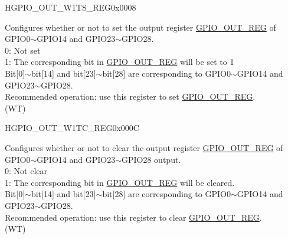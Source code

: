 \begin{register}{H}{GPIO\_OUT\_W1TS\_REG}{0x0008}\label{regdesc:GPIOOUTW1TSREG}
%
\regnewline%
\begin{regdesc}\begin{reglist}
\label{fielddesc:GPIOOUTW1TS}\item [GPIO\_OUT\_W1TS] Configures whether or not to set the output register \hyperref[regdesc:GPIOOUTREG]{GPIO\_OUT\_REG} of GPIO0$\sim$GPIO14 and GPIO23$\sim$GPIO28.\\
0: Not set\\
1: The corresponding bit in \hyperref[regdesc:GPIOOUTREG]{GPIO\_OUT\_REG} will be set to 1\\
Bit[0]$\sim$bit[14] and bit[23]$\sim$bit[28] are corresponding to GPIO0$\sim$GPIO14 and GPIO23$\sim$GPIO28. \\
Recommended operation: use this register to set \hyperref[regdesc:GPIOOUTREG]{GPIO\_OUT\_REG}. \\ (WT)
\end{reglist}\end{regdesc}
\end{register}


\begin{register}{H}{GPIO\_OUT\_W1TC\_REG}{0x000C}\label{regdesc:GPIOOUTW1TCREG}
%
\regnewline%
\begin{regdesc}\begin{reglist}
\label{fielddesc:GPIOOUTW1TC}\item [GPIO\_OUT\_W1TC] Configures whether or not to clear the output register \hyperref[regdesc:GPIOOUTREG]{GPIO\_OUT\_REG} of GPIO0$\sim$GPIO14 and GPIO23$\sim$GPIO28 output.\\
0: Not clear\\
1: The corresponding bit in \hyperref[regdesc:GPIOOUTREG]{GPIO\_OUT\_REG} will be cleared.\\
Bit[0]$\sim$bit[14] and bit[23]$\sim$bit[28] are corresponding to GPIO0$\sim$GPIO14 and GPIO23$\sim$GPIO28. \\
Recommended operation: use this register to clear \hyperref[regdesc:GPIOOUTREG]{GPIO\_OUT\_REG}. \\ (WT)
\end{reglist}\end{regdesc}
\end{register}


